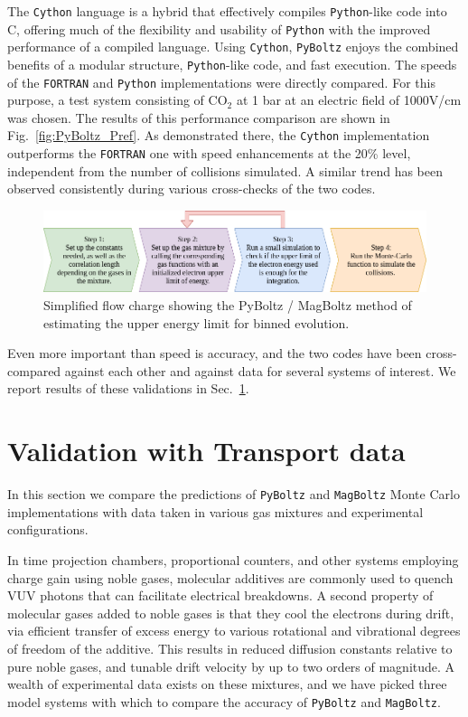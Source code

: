 \documentclass[3p,11pt]{elsarticle}
\begin{document}
The {\tt Cython} language is a hybrid that effectively compiles {\tt Python}-like code into C, offering much of the flexibility and usability of {\tt Python} with the improved performance of a compiled language. Using {\tt Cython}, {\tt PyBoltz} enjoys the combined benefits of a modular structure, {\tt Python}-like code, and fast execution.  The speeds of the {\tt FORTRAN} and {\tt Python} implementations were directly compared. For this purpose, a test system consisting of CO$_2$ at 1 bar at an electric field of 1000V/cm was chosen.  The results of this performance comparison are shown in Fig.~\ref{fig:PyBoltz_Pref}.  As demonstrated there, the {\tt Cython} implementation outperforms the {\tt FORTRAN} one with speed enhancements at the 20\% level, independent from the number of collisions simulated.  A similar trend has been observed consistently during various cross-checks of the two codes.
%
\begin{figure}
\begin{centering}
\includegraphics[width=0.99\columnwidth]{Figures/FlowChart.png}
\par\end{centering}
\caption{Simplified flow charge showing the PyBoltz / MagBoltz method of estimating the upper energy limit for binned evolution.
\label{fig:PyBoltz_Flow}}
\end{figure}
%

Even more important than speed is accuracy, and the two codes have been cross-compared against each other and against data for several systems of interest. We report results of these validations in Sec.~\ref{vali}.

\section{Validation with Transport data}

\label{vali}

In this section we compare the predictions of {\tt PyBoltz} and {\tt MagBoltz} Monte Carlo implementations with data taken in various gas mixtures and experimental configurations. 

In time projection chambers, proportional counters, and other systems employing charge gain using noble gases, molecular additives are commonly used to quench VUV photons that can facilitate electrical breakdowns.  A second property of molecular gases added to noble gases is that they cool the electrons during drift, via efficient transfer of excess energy to various rotational and vibrational degrees of freedom of the additive.  This results in reduced diffusion constants relative to pure noble gases, and tunable drift velocity by up to two orders of magnitude.  A wealth of experimental data exists on these mixtures, and we have picked three model systems with which to compare the accuracy of {\tt PyBoltz} and {\tt MagBoltz}.
\end{document}
